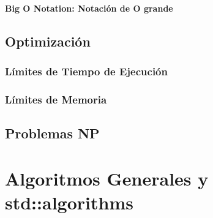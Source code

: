 \documentclass[12pt, fleqn]{report}                             %
\theoremstyle{break}                                            %
\begin{document}
            \subsection{Big O Notation: Notación de O grande}



    \clearpage
    \chapter{Optimización}

        \section{Límites de Tiempo de Ejecución}

        \section{Límites de Memoria}



    \clearpage
    \chapter{Problemas NP}


\part{Algoritmos Generales y std::algorithms}
\end{document}
